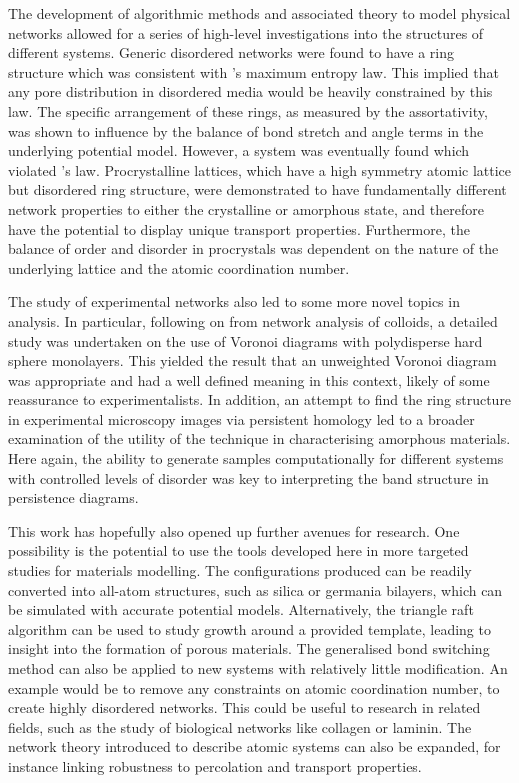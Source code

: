 The development of algorithmic methods and associated theory to model physical networks allowed for a series of high\--level investigations into the structures of different systems.
Generic disordered networks were found to have a ring structure which was consistent with \lm's maximum entropy law.
This implied that any pore distribution in disordered media would be heavily constrained by this law.
The specific arrangement of these rings, as measured by the assortativity, was shown to influence by the balance of bond stretch and angle terms in the underlying potential model.
However, a system was eventually found which violated \lm's law.
Procrystalline lattices, which have a high symmetry atomic lattice but disordered ring structure, were demonstrated to have fundamentally different network properties to either the crystalline or amorphous state, and therefore have the potential to display unique transport properties.
Furthermore, the balance of order and disorder in procrystals was dependent on the nature of the underlying lattice and the atomic coordination number.

The study of experimental \td{} networks also led to some more novel topics in analysis.
In particular, following on from network analysis of colloids, a detailed study was undertaken on the use of Voronoi diagrams with polydisperse hard sphere monolayers.
This yielded the result that an unweighted Voronoi diagram was appropriate and had a well defined meaning in this context, likely of some reassurance to experimentalists.
In addition, an attempt to find the ring structure in experimental microscopy images via persistent homology led to a broader examination of the utility of the technique in characterising amorphous materials.
Here again, the ability to generate samples computationally for different systems with controlled levels of disorder was key to interpreting the band structure in persistence diagrams.

This work has hopefully also opened up further avenues for research.
One possibility is the potential to use the tools developed here in more targeted studies for materials modelling.
The configurations produced can be readily converted into all\--atom structures, such as silica or germania bilayers, which can be simulated with accurate potential models.
Alternatively, the triangle raft algorithm can be used to study growth around a provided template, leading to insight into the formation of porous materials.
The generalised bond switching method can also be applied to new systems with relatively little modification.
An example would be to remove any constraints on atomic coordination number, to create highly disordered networks.
This could be useful to research in related fields, such as the study of  biological networks like collagen or laminin. 
The network theory introduced to describe atomic systems can also be expanded, for instance linking robustness to percolation and transport properties.

